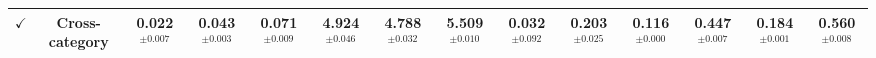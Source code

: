 \begin{table}
{\begin{tabular}{@{}cccccccccccccc@{}}
        \(\checkmark\) & Cross-category &
        \textbf{0.022$^{\pm0.007}$} & 0.043$^{\pm0.003}$ & \textbf{0.071$^{\pm0.009}$} &
        \textbf{4.924$^{\pm0.046}$} &
        \textbf{4.788$^{\pm0.032}$} &
        5.509$^{\pm0.010}$ &
        \textbf{0.032$^{\pm0.092}$} &
        0.203$^{\pm0.025}$ &
        0.116$^{\pm0.000}$ &
        \textbf{0.447$^{\pm0.007}$} & \textbf{0.184$^{\pm0.001}$} & \textbf{0.560$^{\pm0.008}$} \\
        
        \bottomrule
    \end{tabular}}
    \vspace{-0.6em}
\end{table}

